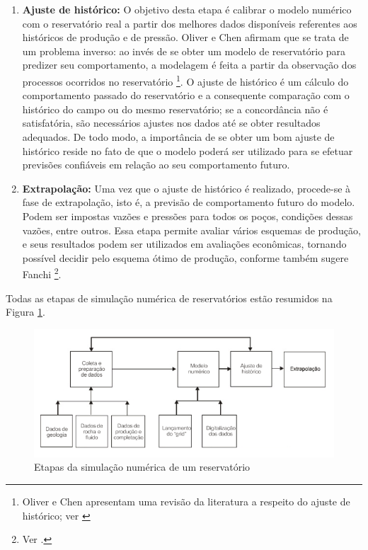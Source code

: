 \begin{enumerate}
\item \textbf{Ajuste de hist\'{o}rico:} O objetivo desta etapa \'{e} calibrar o modelo num\'{e}rico com o reservat\'{o}rio real a partir dos melhores dados dispon\'{i}veis referentes aos hist\'{o}ricos de produ\c{c}\~{a}o e de press\~{a}o. Oliver e Chen afirmam que se trata de um problema inverso: ao inv\'{e}s de se obter um modelo de reservat\'{o}rio para predizer seu comportamento, a modelagem \'{e} feita a partir da observa\c{c}\~{a}o dos processos ocorridos no reservat\'{o}rio \cite{Oliver2011}\footnote{Oliver e Chen apresentam uma revis\~{a}o da literatura a respeito do ajuste de hist\'{o}rico; ver \cite{Oliver2011}}. O ajuste de hist\'{o}rico \'{e} um c\'{a}lculo do comportamento passado do reservat\'{o}rio e a consequente compara\c{c}\~{a}o com o hist\'{o}rico do campo ou do mesmo reservat\'{o}rio; se a concord\^{a}ncia n\~{a}o \'{e} satisfat\'{o}ria, s\~{a}o necess\'{a}rios ajustes nos dados at\'{e} se obter resultados adequados. De todo modo, a import\^{a}ncia de se obter um bom ajuste de hist\'{o}rico reside no fato de que o modelo poder\'{a} ser utilizado para se efetuar previs\~{o}es confi\'{a}veis em rela\c{c}\~{a}o ao seu comportamento futuro.
\item \textbf{Extrapola\c{c}\~{a}o:} Uma vez que o ajuste de hist\'{o}rico \'{e} realizado, procede-se \`{a} fase de extrapola\c{c}\~{a}o, isto \'{e}, a previs\~{a}o de comportamento futuro do modelo. Podem ser impostas vaz\~{o}es e press\~{o}es para todos os po\c{c}os, condi\c{c}\~{o}es dessas vaz\~{o}es, entre outros. Essa etapa permite avaliar v\'{a}rios esquemas de produ\c{c}\~{a}o, e seus resultados podem ser utilizados em avalia\c{c}\~{o}es econ\^{o}micas, tornando poss\'{i}vel decidir pelo esquema \'{o}timo de produ\c{c}\~{a}o, conforme tamb\'{e}m sugere Fanchi \footnote{Ver \cite[p. 373]{fanchi}.}.
\end{enumerate}

Todas as etapas de simula\c{c}\~{a}o num\'{e}rica de reservat\'{o}rios est\~{a}o resumidos na Figura \ref{fig:revisao_simsec2}.

\begin{figure}[!ht]
	\centering
	\includegraphics[width=.75\textwidth]{figs/revisao/revisao_simsec2}
	\caption{Etapas da simula\c{c}\~{a}o num\'{e}rica de um reservat\'{o}rio \cite[p. 523]{engres}}
	\label{fig:revisao_simsec2}
\end{figure}